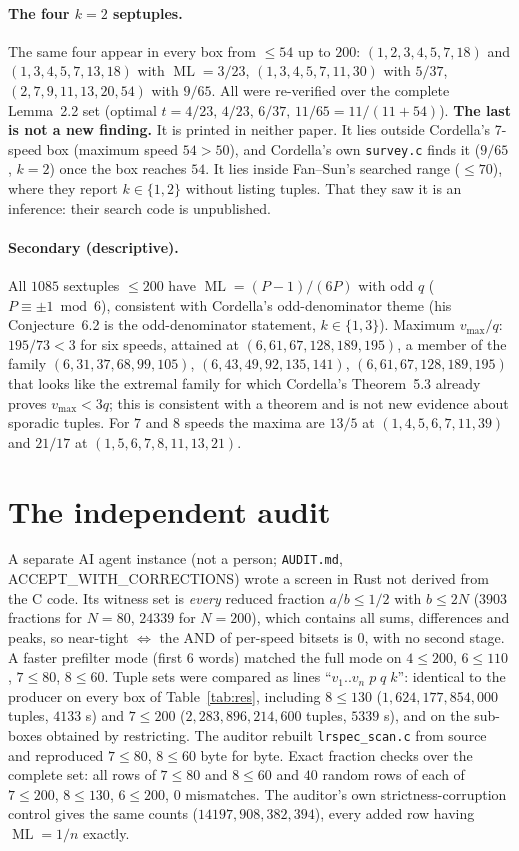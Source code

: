 \documentclass[10pt]{article}
\newcommand{\ML}{\operatorname{ML}}
\begin{document}
\paragraph{The four $k=2$ septuples.} The same four appear in every box from $\le54$ up to $200$: $(1,2,3,4,5,7,18)$ and $(1,3,4,5,7,13,18)$ with $\ML=3/23$, $(1,3,4,5,7,11,30)$ with $5/37$, $(2,7,9,11,13,20,54)$ with $9/65$. All were re-verified over the complete Lemma~2.2 set (optimal $t=4/23,\,4/23,\,6/37,\,11/65=11/(11+54)$). \textbf{The last is not a new finding.} It is printed in neither paper. It lies outside Cordella's 7-speed box (maximum speed $54>50$), and Cordella's own \texttt{survey.c} finds it ($9/65$, $k=2$) once the box reaches $54$. It lies inside Fan--Sun's searched range ($\le70$), where they report $k\in\{1,2\}$ without listing tuples. That they saw it is an inference: their search code is unpublished.

\paragraph{Secondary (descriptive).} All $1085$ sextuples $\le200$ have $\ML=(P-1)/(6P)$ with odd $q$ ($P\equiv\pm1\bmod6$), consistent with Cordella's odd-denominator theme (his Conjecture~6.2 is the odd-denominator statement, $k\in\{1,3\}$). Maximum $v_{\max}/q$: $195/73<3$ for six speeds, attained at $(6,61,67,128,189,195)$, a member of the family $(6,31,37,68,99,105)$, $(6,43,49,92,135,141)$, $(6,61,67,128,189,195)$ that looks like the extremal family for which Cordella's Theorem~5.3 already proves $v_{\max}<3q$; this is consistent with a theorem and is not new evidence about sporadic tuples. For $7$ and $8$ speeds the maxima are $13/5$ at $(1,4,5,6,7,11,39)$ and $21/17$ at $(1,5,6,7,8,11,13,21)$.

\section{The independent audit}\label{sec:audit}
A separate AI agent instance (not a person; \texttt{AUDIT.md}, ACCEPT\_WITH\_CORRECTIONS) wrote a screen in Rust not derived from the C code. Its witness set is \emph{every} reduced fraction $a/b\le1/2$ with $b\le2N$ ($3903$ fractions for $N=80$, $24339$ for $N=200$), which contains all sums, differences and peaks, so near-tight $\iff$ the AND of per-speed bitsets is $0$, with no second stage. A faster prefilter mode (first $6$ words) matched the full mode on $4\le200$, $6\le110$, $7\le80$, $8\le60$. Tuple sets were compared as lines ``$v_1..v_n\;p\;q\;k$'': identical to the producer on every box of Table~\ref{tab:res}, including $8\le130$ ($1{,}624{,}177{,}854{,}000$ tuples, $4133$ s) and $7\le200$ ($2{,}283{,}896{,}214{,}600$ tuples, $5339$ s), and on the sub-boxes obtained by restricting. The auditor rebuilt \texttt{lrspec\_scan.c} from source and reproduced $7\le80$, $8\le60$ byte for byte. Exact fraction checks over the complete set: all rows of $7\le80$ and $8\le60$ and $40$ random rows of each of $7\le200$, $8\le130$, $6\le200$, $0$ mismatches. The auditor's own strictness-corruption control gives the same counts ($14197,908,382,394$), every added row having $\ML=1/n$ exactly.
\end{document}

